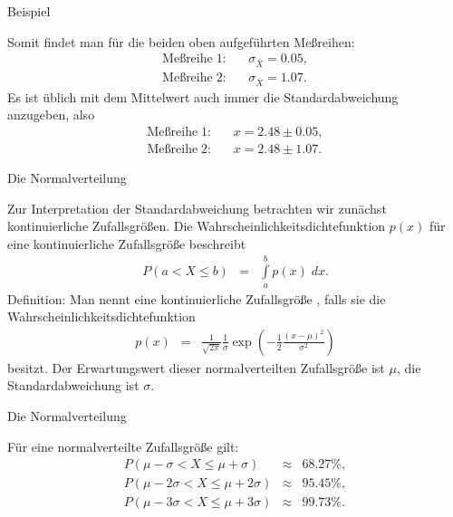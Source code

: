 \documentclass[german]{beamer}
\newcommand{\bq}{\begin{eqnarray*}}
\newcommand{\eq}{\end{eqnarray*}}
\newcommand{\superalert}[1]{{\color{MyYellowOrange}{#1}}}
\begin{document}
\begin{frame}{Beispiel}

Somit findet man f\"ur die beiden oben aufgef\"uhrten Me{\ss}reihen:
\bq
 \mbox{Me{\ss}reihe}\; 1: & & \sigma_{\bar{X}} = 0.05,
 \nonumber \\
 \mbox{Me{\ss}reihe}\; 2: & & \sigma_{\bar{X}} = 1.07.
\eq
Es ist \"ublich mit dem Mittelwert auch immer die Standardabweichung anzugeben, also
\bq
 \mbox{Me{\ss}reihe}\; 1: & & x = 2.48 \pm 0.05,
 \nonumber \\
 \mbox{Me{\ss}reihe}\; 2: & & x = 2.48 \pm 1.07.
\eq

\end{frame}

\begin{frame}{Die Normalverteilung}

Zur Interpretation der Standardabweichung betrachten wir zun\"achst \alert{kontinuierliche Zufallsgr\"o{\ss}en}.
Die Wahrscheinlichkeitsdichtefunktion $p(x)$ f\"ur eine kontinuierliche Zufallsgr\"o{\ss}e
beschreibt
\bq
 P\left( a < X \le b \right)
 & = & \int\limits_a^b p(x) \; dx.
\eq
Definition: Man nennt eine kontinuierliche Zufallsgr\"o{\ss}e \superalert{normalverteilt},
falls sie die Wahrscheinlichkeitsdichtefunktion
\bq
 p(x) & = & \frac{1}{\sqrt{2\pi}} \frac{1}{\sigma} \exp\left( - \frac{1}{2} \frac{(x-\mu)^2}{\sigma^2} \right)
\eq
besitzt. Der Erwartungswert dieser normalverteilten Zufallsgr\"o{\ss}e ist $\mu$, die Standardabweichung
ist $\sigma$.

\end{frame}

\begin{frame}{Die Normalverteilung}

F\"ur eine normalverteilte Zufallsgr\"o{\ss}e gilt:
\bq
 P\left( \mu-\sigma < X \le \mu+\sigma \right) & \approx & 68.27 \%,
 \nonumber \\
 P\left( \mu-2\sigma < X \le \mu+2\sigma \right) & \approx & 95.45 \%,
 \nonumber \\
 P\left( \mu-3\sigma < X \le \mu+3\sigma \right) & \approx & 99.73 \%.
\eq

\end{frame}
\end{document}
